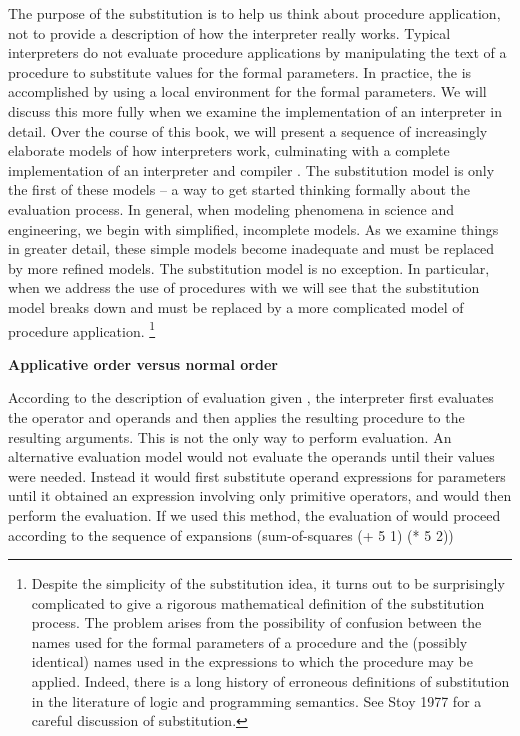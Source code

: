 The purpose of the substitution is to help us think about procedure application,
not to provide a description of how the interpreter really works.
Typical interpreters do not evaluate procedure applications
by manipulating the text of a procedure to substitute values for the formal parameters.
In practice, the  is accomplished by using a local environment for the formal parameters.
We will discuss this more fully  when we examine the implementation of an interpreter in detail.
Over the course of this book,
we will present a sequence of increasingly elaborate models of how interpreters work,
culminating with a complete implementation of an interpreter and compiler .
The substitution model is only the first of these models
-- a way to get started thinking formally about the evaluation process.
In general,
when modeling phenomena in science and engineering, we begin with simplified, incomplete models.
As we examine things in greater detail,
these simple models become inadequate and must be replaced by more refined models.
The substitution model is no exception.
In particular,
when we address  the use of procedures with 
we will see that the substitution model breaks down
and must be replaced by a more complicated model of procedure application.
\footnote{%
   Despite the simplicity of the substitution idea,
   it turns out to be surprisingly complicated
   to give a rigorous mathematical definition of the substitution process.
   The problem arises from the possibility of confusion
   between the names used for the formal parameters of a procedure
   and the (possibly identical) names used in the expressions to which the procedure may be applied.
   Indeed, there is a long history of erroneous definitions of substitution
   in the literature of logic and programming semantics.
   See Stoy 1977 for a careful discussion of substitution.
}

{\bf Applicative order versus normal order}

According to the description of evaluation given ,
the interpreter first evaluates the operator and operands
and then applies the resulting procedure to the resulting arguments.
This is not the only way to perform evaluation.
An alternative evaluation model would not evaluate the operands until their values were needed.
Instead it would first substitute operand expressions for parameters
until it obtained an expression involving only primitive operators,
and would then perform the evaluation.
If we used this method, the evaluation of  would proceed according to the sequence of expansions
\startcode
(sum-of-squares (+ 5 1) (* 5 2))

